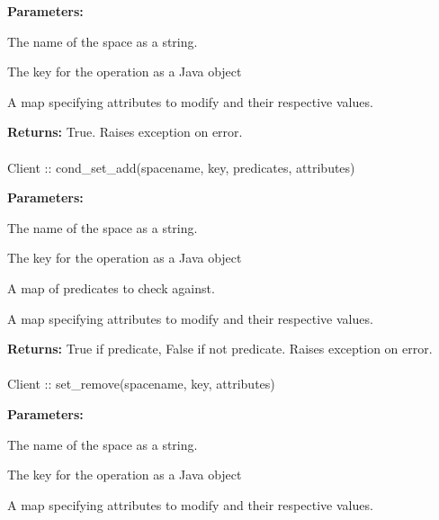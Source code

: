 \noindent\textbf{Parameters:}
\begin{description}[labelindent=\widthof{{\code{attributes}}},leftmargin=*,noitemsep,nolistsep,align=right]
\item[\code{spacename}] The name of the space as a string.
\item[\code{key}] The key for the operation as a Java object
\item[\code{attributes}] A map specifying attributes to modify and their respective values.
\end{description}

\noindent\textbf{Returns:}
True.  Raises exception on error.

\paragraph{}
\label{api:java:cond_set_add}
\begin{javacode}
Client :: cond_set_add(spacename, key, predicates, attributes)
\end{javacode}


\noindent\textbf{Parameters:}
\begin{description}[labelindent=\widthof{{\code{predicates}}},leftmargin=*,noitemsep,nolistsep,align=right]
\item[\code{spacename}] The name of the space as a string.
\item[\code{key}] The key for the operation as a Java object
\item[\code{predicates}] A map of predicates to check against.
\item[\code{attributes}] A map specifying attributes to modify and their respective values.
\end{description}

\noindent\textbf{Returns:}
True if predicate, False if not predicate.  Raises exception on error.

\paragraph{}
\label{api:java:set_remove}
\begin{javacode}
Client :: set_remove(spacename, key, attributes)
\end{javacode}


\noindent\textbf{Parameters:}
\begin{description}[labelindent=\widthof{{\code{attributes}}},leftmargin=*,noitemsep,nolistsep,align=right]
\item[\code{spacename}] The name of the space as a string.
\item[\code{key}] The key for the operation as a Java object
\item[\code{attributes}] A map specifying attributes to modify and their respective values.
\end{description}


